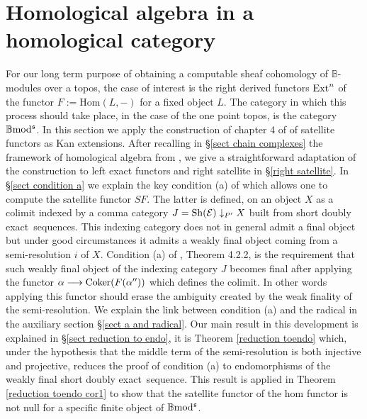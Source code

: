 \documentclass[12pt]{article}
\def\Hom{{\rm Hom}}
\def\ext{{\rm Ext}}
\def\coker{{\rm Coker}}
\def\B{{\mathbb B}}
\def\exxx{{doubly exact}~}
\def\cE{{\mathcal E}}
\def\Hom {{\mbox{Hom}}}
\def\sequ{{\rm Sh}}
\def\b2{{\rm \B mod^{\mathfrak s}}}
\begin{document}
\section{Homological algebra in a homological category}\label{homological grandis}
 
 For our long term purpose of obtaining 
  a computable sheaf cohomology of $\B$-modules over a topos, the case of interest is the right derived functors $\ext^n$ of the functor $F:=\Hom(L,-)$ for a fixed object $L$. The  category in which this process should take place, in the case of the one point topos, is the category $\b2$. In this section we apply the construction of chapter 4 of \cite{gra1} of satellite functors as Kan extensions. After recalling in \S\ref{sect chain complexes} the framework of homological algebra from \cite{gra1}, we give a straightforward adaptation of the construction to left exact functors and right satellite in \S \ref{right satellite}. In \S \ref{sect condition a}  we explain the key condition (a) of \cite{gra1} which allows one to compute the satellite functor $SF$. The latter is defined, on an object $X$ as a colimit indexed by a  comma  category $J=\sequ(\cE)\downarrow_{P'} X$ built from  short \exxx sequences. This indexing category does not in general admit a final object but under good circumstances it admits a weakly final object coming from a semi-resolution $i$ of $X$. Condition (a) of \cite{gra1}, Theorem 4.2.2, is the requirement that such weakly final object of the indexing category $J$ becomes final after applying the functor $\alpha\longrightarrow \coker(F(\alpha''))$ which defines the colimit. In other words applying this functor should erase the ambiguity created by the weak finality of the semi-resolution. We explain 
  the link between condition (a) and the radical  in the auxiliary section \S \ref{sect a and radical}.
Our main result in this development is explained in \S \ref{sect reduction to endo}, it is Theorem \ref{reduction toendo}  which, under the hypothesis that the middle term of the semi-resolution is both injective and projective, reduces the proof of condition (a) to endomorphisms of the weakly final  short \exxx sequence. This result is applied in Theorem \ref{reduction toendo cor1} to show that the satellite functor of the hom functor is not null for a specific finite object of $\b2$.   
  
  
  
  
  
\end{document}
